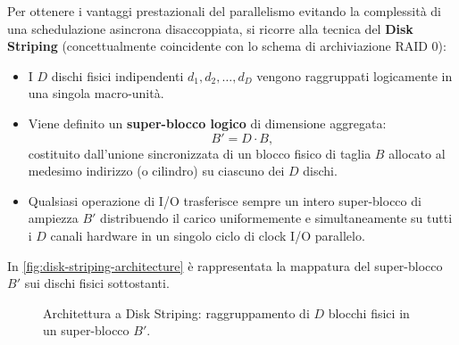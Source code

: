 Per ottenere i vantaggi prestazionali del parallelismo evitando la complessità di una schedulazione asincrona disaccoppiata, si ricorre alla tecnica del \textbf{Disk Striping} (concettualmente coincidente con lo schema di archiviazione RAID 0):
\begin{itemize}
  \item I $D$ dischi fisici indipendenti $d_1, d_2, \dots, d_D$ vengono raggruppati logicamente in una singola macro-unità.
  \item Viene definito un \textbf{super-blocco logico} di dimensione aggregata:
  \begin{equation}
    B' = D \cdot B,
  \end{equation}
  costituito dall'unione sincronizzata di un blocco fisico di taglia $B$ allocato al medesimo indirizzo (o cilindro) su ciascuno dei $D$ dischi.
  \item Qualsiasi operazione di I/O trasferisce sempre un intero super-blocco di ampiezza $B'$ distribuendo il carico uniformemente e simultaneamente su tutti i $D$ canali hardware in un singolo ciclo di clock I/O parallelo.
\end{itemize}

In \autoref{fig:disk-striping-architecture} è rappresentata la mappatura del super-blocco $B'$ sui dischi fisici sottostanti.

\begin{figure}[H]
  \centering
  \caption{Architettura a Disk Striping: raggruppamento di $D$ blocchi fisici in un super-blocco $B'$.}
  \label{fig:disk-striping-architecture}
\end{figure}

